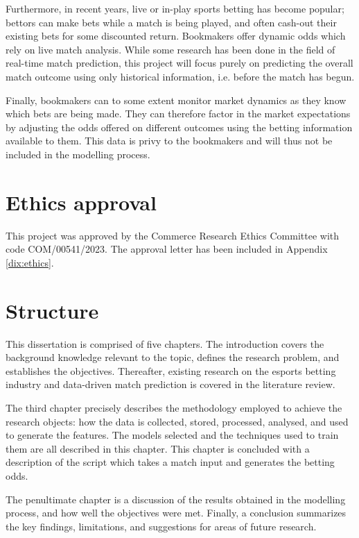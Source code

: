 Furthermore, in recent years, live or in-play sports betting has become popular; bettors can make bets while a match is being played, and often cash-out their existing bets for some discounted return. Bookmakers offer dynamic odds which rely on live match analysis. While some research has been done in the field of real-time match prediction, this project will focus purely on predicting the overall match outcome using only historical information, i.e. before the match has begun.

Finally, bookmakers can to some extent monitor market dynamics as they know which bets are being made. They can therefore factor in the market expectations by adjusting the odds offered on different outcomes using the betting information available to them. This data is privy to the bookmakers and will thus not be included in the modelling process.

\section{Ethics approval}

This project was approved by the Commerce Research Ethics Committee with code COM/00541/2023. The approval letter has been included in Appendix \ref{dix:ethics}.

\section{Structure}

This dissertation is comprised of five chapters. The introduction covers the background knowledge relevant to the topic, defines the research problem, and establishes the objectives. Thereafter,  existing research on the esports betting industry and data-driven match prediction is covered in the literature review. 

The third chapter precisely describes the methodology employed to achieve the research objects: how the data is collected, stored, processed, analysed, and used to generate the features. The models selected and the techniques used to train them are all described in this chapter. This chapter is concluded with a description of the script which takes a match input and generates the betting odds. 

The penultimate chapter is a discussion of the results obtained in the modelling process, and how well the objectives were met. Finally, a conclusion summarizes the key findings, limitations, and suggestions for areas of future research.